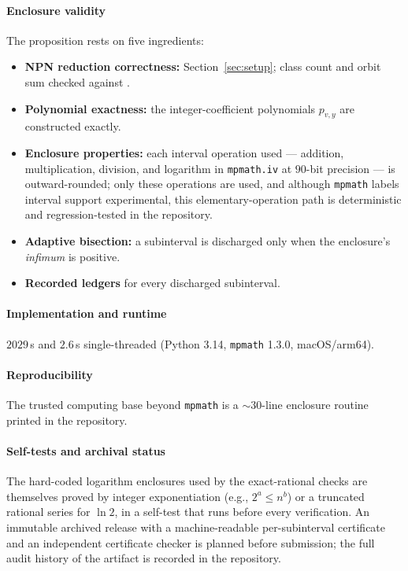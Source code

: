 \documentclass[12pt,draftclsnofoot,onecolumn,journal]{IEEEtran}
\begin{document}
\paragraph{Enclosure validity} The proposition rests on five ingredients:
\begin{itemize}
\item \textbf{NPN reduction correctness:} Section~\ref{sec:setup}; class
count and orbit sum checked against \cite{Harrison65}.
\item \textbf{Polynomial exactness:} the integer-coefficient polynomials
$p_{v,y}$ are constructed exactly.
\item \textbf{Enclosure properties:} each interval operation used ---
addition, multiplication, division, and logarithm in \texttt{mpmath.iv} at
$90$-bit precision --- is outward-rounded; only these operations are used,
and although \texttt{mpmath} labels interval support experimental, this
elementary-operation path is deterministic and regression-tested in the
repository.
\item \textbf{Adaptive bisection:} a subinterval is discharged only when
the enclosure's \emph{infimum} is positive.
\item \textbf{Recorded ledgers} for every discharged subinterval.
\end{itemize}

\paragraph{Implementation and runtime} $2029$\,s and $2.6$\,s
single-threaded (Python 3.14, \texttt{mpmath} 1.3.0, macOS/arm64).

\paragraph{Reproducibility} The trusted computing base beyond
\texttt{mpmath} is a ${\sim}30$-line enclosure routine printed in the
repository.

\paragraph{Self-tests and archival status} The hard-coded logarithm
enclosures used by the exact-rational checks are themselves proved by integer
exponentiation (e.g., $2^{a}\le n^{b}$) or a truncated rational series for
$\ln2$, in a self-test that runs before every verification. An immutable
archived release with a machine-readable per-subinterval certificate and an
independent certificate checker is planned before submission; the full audit
history of the artifact is recorded in the repository.
\end{document}
